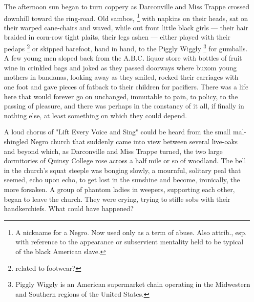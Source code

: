   The afternoon sun began to turn coppery as Darconville and Miss Trappe crossed
downhill toward the ring-road. Old sambos, 
\footnote{ A nickname for a Negro. Now used only as a term of abuse. Also
attrib., esp. with reference to the appearance or subservient mentality held to
be typical of the black American slave.
}
with napkins on their heads, sat on their warped 
cane-chairs and waved, while out front little black girls --- their
hair braided in corn-row tight plaits, their legs ashen 
--- either played with their pedaps 
\footnote{ \textdbend related to footwear?}
or skipped barefoot, hand in hand, to the Piggly Wiggly 
\footnote{Piggly Wiggly is an American supermarket chain operating in the
  Midwestern and Southern regions of the United States. }
for gumballs. 
A few young men sloped back from the A.B.C. liquor store with bottles of fruit
wine in crinkled 
bags and joked as they passed doorways where buxom 
young mothers in bandanas, 
looking away as they smiled, rocked their carriages with
one foot and gave pieces of fatback 
to their children for pacifiers. There was a
life here that would forever go on unchanged, immutable to pain, to policy, to
the passing of pleasure, and there was perhaps in the constancy of it all, if
finally in nothing else, at least something on which they could depend.

  A loud chorus of "Lift Every Voice and Sing" could be heard from the small
mal-shingled 
Negro church that suddenly came into view between several live-oaks
and beyond which, as Darconville and Miss Trappe turned, the two large
dormitories of Quinsy College rose across a half mile or so of woodland. The
bell in the church's squat 
steeple was bonging 
slowly, a mournful, solitary peal
that seemed, echo upon echo, to get lost in the sunshine and become, ironically,
the more forsaken. A group of phantom ladies in weepers, 
supporting each other,
began to leave the church. They were crying, trying to stifle sobs with their
handkerchiefs. What could have happened?

